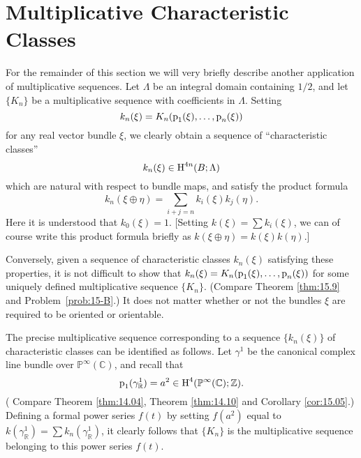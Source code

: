 \documentclass[../main]{subfiles}
\begin{document}
\section{Multiplicative Characteristic Classes}
For the remainder of this section we will very briefly describe another application of multiplicative sequences. Let $\Lambda$ be an integral domain containing $1/2$, and let $\{K_n\}$ be a multiplicative sequence with coefficients in $\Lambda$. Setting \[k_n(\xi) = K_n(\operatorname{p}_1(\xi), \ldots, \operatorname{p}_n(\xi))\] for any real vector bundle $\xi$, we clearly obtain a sequence of ``characteristic classes'' \[k_n(\xi) \in \operatorname{H}^{4n}(B; \Lambda)\] which are natural with respect to bundle maps, and satisfy the product formula \[k_n(\xi \oplus \eta) = \sum_{i + j = n} k_i(\xi) k_j(\eta).\] Here it is understood that $k_0(\xi) = 1$. [Setting $\displaystyle k(\xi) = \sum k_i(\xi)$, we can of course write this product formula briefly as $k(\xi \oplus \eta) = k(\xi) k(\eta)$.]

Conversely, given a sequence of characteristic classes $k_n(\xi)$ satisfying these properties, it is not difficult to show that $k_n(\xi) = K_n(\operatorname{p}_1(\xi), \ldots, \operatorname{p}_n(\xi))$ for some uniquely defined multiplicative sequence $\{K_n\}$. (Compare Theorem \ref{thm:15.9} and Problem~\ref{prob:15-B}.) It does not matter whether or not the bundles $\xi$ are required to be oriented or orientable. 

The precise multiplicative sequence corresponding to a sequence $\{k_n(\xi)\}$ of characteristic classes can be identified as follows. Let $\gamma^1$ be the canonical complex line bundle over ${\mathbb P}^\infty(\mathbb C)$, and recall that \[\operatorname{p}_1(\gamma_{\mathbb R}^1) = a^2 \in \operatorname{H}^4({\mathbb P}^\infty(\mathbb C); \mathbb Z).\] (
Compare Theorem \ref{thm:14.04}, Theorem \ref{thm:14.10} and Corollary \ref{cor:15.05}.) Defining a formal power series $f(t)$ by setting $f(a^2)$ equal to $\displaystyle k(\gamma_{\mathbb R}^1) = \sum k_n(\gamma_{\mathbb R}^1)$, it clearly follows that $\{K_n\}$ is the multiplicative sequence belonging to this power series $f(t)$. 
\end{document}
